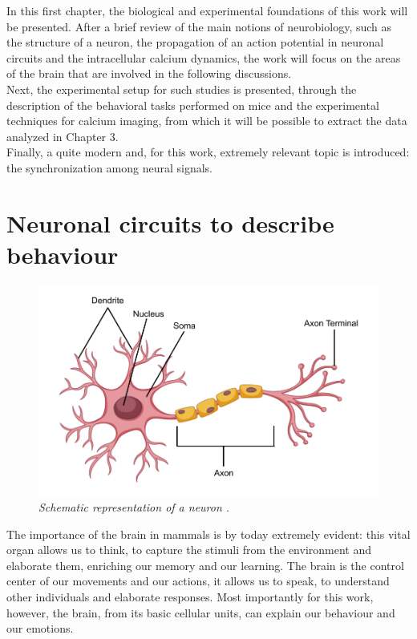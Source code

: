 \documentclass[12pt, a4paper]{report}
\begin{document}
	
	In this first chapter, the biological and experimental foundations of this work will be presented. After a brief review of the main notions of neurobiology, such as the structure of a neuron, the propagation of an action potential in neuronal circuits and the intracellular calcium dynamics, the work will focus on the areas of the brain that are involved in the following discussions.\\
	Next, the experimental setup for such studies is presented, through the description of the behavioral tasks performed on mice and the experimental techniques for calcium imaging, from which it will be possible to extract the data analyzed in Chapter 3.\\
	Finally, a quite modern and, for this work, extremely relevant topic is introduced: the synchronization among neural signals.
	
	\section{Neuronal circuits to describe behaviour} \label{first section}
	
	\begin{figure}[H]
		\begin{center}
			\includegraphics[scale=.25]{neuron.png} 
		\end{center} 
		\caption{\textit{Schematic representation of a neuron \cite{42}.}} \label{neuron}
		
	\end{figure}
	
	The importance of the brain in mammals is by today extremely evident: this vital organ allows us to think,  to capture the stimuli from the environment and elaborate them, enriching our memory and  our learning. The brain is the control center of our movements and our actions, it allows us to speak, to understand other individuals and elaborate responses. Most importantly for this work, however, the brain, from its basic cellular units, can explain our behaviour and our emotions. \\
\end{document}
